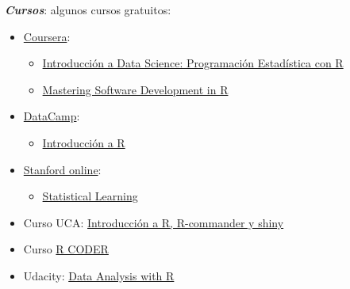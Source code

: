\documentclass[]{book}
\providecommand{\tightlist}{%
  \setlength{\itemsep}{0pt}\setlength{\parskip}{0pt}}
\begin{document}
\textbf{\emph{Cursos}}: algunos cursos gratuitos:

\begin{itemize}
\item
  \href{https://www.coursera.org/}{Coursera}:

  \begin{itemize}
  \item
    \href{https://www.coursera.org/learn/intro-data-science-programacion-estadistica-r}{Introducción
    a Data Science: Programación Estadística con R}
  \item
    \href{https://www.coursera.org/specializations/r}{Mastering Software
    Development in R}
  \end{itemize}
\end{itemize}

\begin{itemize}
\item
  \href{https://www.datacamp.com/courses}{DataCamp}:

  \begin{itemize}
  \tightlist
  \item
    \href{https://www.datacamp.com/courses/introduccion-a-r/}{Introducción
    a R}
  \end{itemize}
\end{itemize}

\begin{itemize}
\item
  \href{http://online.stanford.edu/courses}{Stanford online}:

  \begin{itemize}
  \tightlist
  \item
    \href{http://online.stanford.edu/course/statistical-learning}{Statistical
    Learning}
  \end{itemize}
\end{itemize}

\begin{itemize}
\tightlist
\item
  Curso UCA:
  \href{http://knuth.uca.es/moodle/course/view.php?id=51}{Introducción a
  R, R-commander y shiny}
\end{itemize}

\begin{itemize}
\tightlist
\item
  Curso \href{https://r-coder.com/curso-r}{R CODER}
\end{itemize}

\begin{itemize}
\tightlist
\item
  Udacity:
  \href{https://eu.udacity.com/course/data-analysis-with-r--ud651}{Data
  Analysis with R}
\end{itemize}
\end{document}
